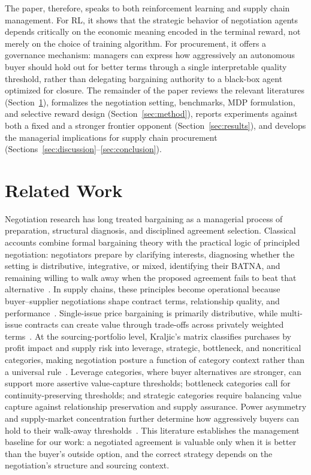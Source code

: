 \documentclass{interact}
\theoremstyle{plain}
\theoremstyle{definition}
\theoremstyle{remark}
\begin{document}
The paper, therefore, speaks to both reinforcement learning and supply chain management. For RL, it shows that the strategic behavior of negotiation agents depends critically on the economic meaning encoded in the terminal reward, not merely on the choice of training algorithm. For procurement, it offers a governance mechanism: managers can express how aggressively an autonomous buyer should hold out for better terms through a single interpretable quality threshold, rather than delegating bargaining authority to a black-box agent optimized for closure. The remainder of the paper reviews the relevant literatures (Section~\ref{sec:related}), formalizes the negotiation setting, benchmarks, MDP formulation, and selective reward design (Section~\ref{sec:method}), reports experiments against both a fixed and a stronger frontier opponent (Section~\ref{sec:results}), and develops the managerial implications for supply chain procurement (Sections~\ref{sec:discussion}--\ref{sec:conclusion}).


\section{Related Work}\label{sec:related}

Negotiation research has long treated bargaining as a managerial process of preparation, structural diagnosis, and disciplined agreement selection. Classical accounts combine formal bargaining theory with the practical logic of principled negotiation: negotiators prepare by clarifying interests, diagnosing whether the setting is distributive, integrative, or mixed, identifying their BATNA, and remaining willing to walk away when the proposed agreement fails to beat that alternative~\cite{nash1950bargaining,fisher1981gettingtoyes,raiffa1982art,lewicki2010negotiation}. In supply chains, these principles become operational because buyer--supplier negotiations shape contract terms, relationship quality, and performance~\cite{hames2012negotiation}. Single-issue price bargaining is primarily distributive, while multi-issue contracts can create value through trade-offs across privately weighted terms~\cite{davis2019multidimensional,haruvy2020bargaining}. At the sourcing-portfolio level, Kraljic's matrix classifies purchases by profit impact and supply risk into leverage, strategic, bottleneck, and noncritical categories, making negotiation posture a function of category context rather than a universal rule~\cite{kraljic1983purchasing}. Leverage categories, where buyer alternatives are stronger, can support more assertive value-capture thresholds; bottleneck categories call for continuity-preserving thresholds; and strategic categories require balancing value capture against relationship preservation and supply assurance. Power asymmetry and supply-market concentration further determine how aggressively buyers can hold to their walk-away thresholds~\cite{kaufmann2004mode,nyaga2013power}. This literature establishes the management baseline for our work: a negotiated agreement is valuable only when it is better than the buyer's outside option, and the correct strategy depends on the negotiation's structure and sourcing context.
\end{document}
